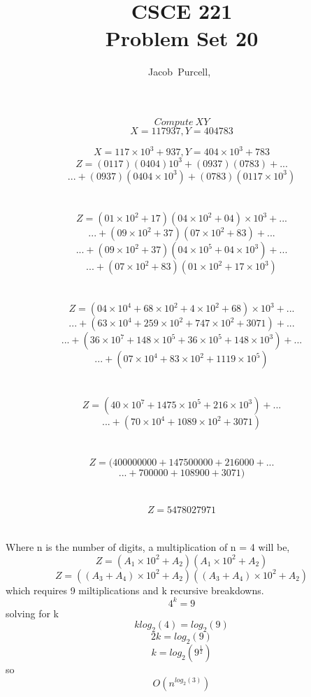 \documentclass[journal]{IEEEtran}
\begin{document}
\title{CSCE 221 \\ Problem Set 20}

\author{Jacob~Purcell,~}

\maketitle
\section{}
$$Compute~XY$$
$$X = 117937, Y = 404783$$

$$X = 117 \times 10^{3} + 937, Y = 404 \times 10^{3} + 783$$
$$Z = (0117)(0404)10^3 + (0937)(0783) +...$$
$$...+ (0937)(0404 \times 10^{3}) + (0783)(0117 \times 10^{3})$$
\\\\
$$Z = (01 \times 10^ 2 + 17)(04 \times 10^ 2 + 04)\times 10^3 +...$$
$$...+ (09\times 10^ 2 + 37)(07 \times 10^ 2 + 83) +...$$
$$...+ (09\times 10^ 2 + 37)(04\times 10^ 5 + 04\times 10^{3}) +...$$
$$...+ (07\times 10^ 2 + 83)(01 \times 10^ 2 + 17 \times 10^{3})$$
\\\\
$$Z = (04 \times 10^ 4 + 68 \times 10^ 2 + 4 \times 10^2 + 68)\times 10^3 +...$$
$$...+ (63\times 10^ 4 + 259 \times 10^ 2 + 747\times 10^ 2 + 3071) +...$$
$$...+ (36\times 10^ 7 + 148\times 10^ 5 + 36\times 10^ 5 + 148\times 10^ 3) +...$$
$$...+ (07\times 10^ 4 + 83\times 10^ 2 + 1119 \times 10^{5})$$
\\\\
$$Z = (40 \times 10^ 7 + 1475 \times 10^5 + 216 \times 10^3) +...$$
$$...+ (70\times 10^ 4 + 1089\times 10^2 + 3071)$$
\\\\
$$Z = (400000000+ 147500000 + 216000 +...$$
$$...+ 700000 + 108900 + 3071)$$
\\\\
$$Z = \boxed{5478027971}$$

\section{}
Where n is the number of digits, a multiplication of n = 4 will be,
$$Z = (A_1 \times 10^2 + A_2)(A_1 \times 10^2 + A_2)$$
$$Z = ((A_3 + A_4) \times 10^2 + A_2)((A_3 + A_4) \times 10^2 + A_2)$$
which requires 9 miltiplications and k recursive breakdowns. 
$$4^k = 9$$
solving for k
$$k log_2(4) = log_2(9)$$
$$2k = log_2(9)$$
$$k = log_2(9^{\frac{1}{2}})$$
so
$$\boxed{O(n^{log_2(3)})}$$
\end{document}
